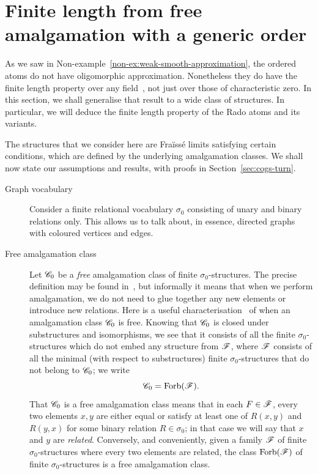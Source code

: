 \section{Finite length from free amalgamation with a generic order}\label{sec:free-amalg}
\renewcommand{\cal}{\mathcal}

As we saw in Non-example~\ref{non-ex:weak-smooth-approximation}, the ordered atoms do not have oligomorphic approximation. 
Nonetheless they do have the finite length property over any field~\cite[Thm.~4.8]{BFKM24}, not just over those of characteristic zero. 
In this section, we shall generalise that result to a wide class of structures. 
In particular, we will deduce the finite length property of the Rado atoms and its variants.

The structures that we consider here are Fraïssé limits satisfying certain conditions, which are defined by the underlying amalgamation classes.
We shall now state our assumptions and results, with proofs in Section~\ref{sec:cogs-turn}.

\begin{description}
    \item[Graph vocabulary] 
    Consider a finite relational vocabulary $\sigma_0$ consisting of unary and binary relations only. 
    This allows us to talk about, in essence, directed graphs with coloured vertices and edges.

    \item[Free amalgamation class] 
    Let $\mathscr{C}_0$ be a \emph{free} amalgamation class of finite $\sigma_0$-structures. 
    The precise definition may be found in~\cite[Sec.~2.1]{Macpherson11}, 
    but informally it means that when we perform amalgamation, we do not need to glue together any new elements or introduce new relations.
    Here is a useful characterisation~\cite[Lem.~4.5]{SS20} of when an amalgamation class $\mathscr{C}_0$ is free.
    Knowing that $\mathscr{C}_0$ is closed under substructures and isomorphisms, 
    we see that it consists of all the finite $\sigma_0$-structures which do not embed any structure from $\mathscr{F}$, 
    where $\mathscr{F}$ consists of all the minimal (with respect to substructures) finite $\sigma_0$-structures that do not belong to $\mathscr{C}_0$;
    we write \[
        \mathscr{C}_0 = \operatorname{Forb}(\mathscr{F}).
    \]
    That $\mathscr{C}_0$ is a free amalgamation class means that in each $F \in \mathscr{F}$, 
    every two elements $x, y$ are either equal or satisfy at least one of $R(x, y)$ and $R(y, x)$ for some binary relation $R \in \sigma_0$; in that case we will say that $x$ and $y$ are \emph{related}.
    Conversely, and conveniently, given a family $\mathscr{F}$ of finite $\sigma_0$-structures where every two elements are related,
    the class $\operatorname{Forb}(\mathscr{F})$ of finite $\sigma_0$-structures is a free amalgamation class.    

\end{description}


